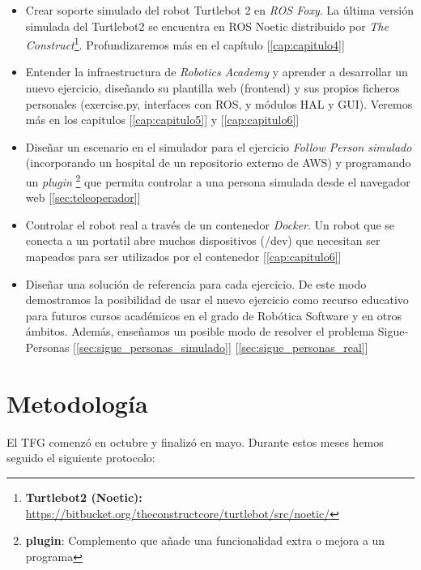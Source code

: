 \begin{itemize}
	\item Crear soporte simulado del robot Turtlebot 2 en \textit{ROS Foxy}. La última versión simulada del Turtlebot2 se encuentra en ROS Noetic distribuido por \textit{The Construct}\footnote{\textbf{Turtlebot2 (Noetic):} \url{https://bitbucket.org/theconstructcore/turtlebot/src/noetic/}}. Profundizaremos más en el capítulo [\ref{cap:capitulo4}]
	\item Entender la infraestructura de \textit{Robotics Academy} y aprender a desarrollar un nuevo ejercicio, diseñando su plantilla web (frontend) y sus propios ficheros personales (exercise.py, interfaces con ROS, y módulos HAL y GUI). Veremos más en los capitulos [\ref{cap:capitulo5}] y [\ref{cap:capitulo6}]
	\item Diseñar un escenario en el simulador para el ejercicio \textit{Follow Person simulado} (incorporando un hospital de un repositorio externo de AWS) y programando un \textit{plugin} \footnote{\textbf{plugin}: Complemento que añade una funcionalidad extra o mejora a un programa} que permita controlar a una persona simulada desde el navegador web [\ref{sec:teleoperador}]
	\item Controlar el robot real a través de un contenedor \textit{Docker}. Un robot que se conecta a un portatil abre muchos dispositivos (/dev) que necesitan ser mapeados para ser utilizados por el contenedor [\ref{cap:capitulo6}]
	\item Diseñar una solución de referencia para cada ejercicio. De este modo demostramos la posibilidad de usar el nuevo ejercicio como recurso educativo para futuros cursos académicos en el grado de Robótica Software y en otros ámbitos. Además, enseñamos un posible modo de resolver el problema Sigue-Personas [\ref{sec:sigue_personas_simulado}] [\ref{sec:sigue_personas_real}]
\end{itemize}



\section{Metodología}
\label{sec:metodologia}
El TFG comenzó en octubre y finalizó en mayo. Durante estos meses hemos seguido el siguiente protocolo:

